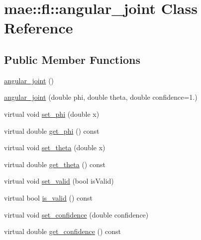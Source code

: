 \hypertarget{classmae_1_1fl_1_1angular__joint}{\section{mae\-:\-:fl\-:\-:angular\-\_\-joint Class Reference}
\label{classmae_1_1fl_1_1angular__joint}
}
\subsection*{Public Member Functions}
\begin{DoxyCompactItemize}
\item 
\hyperlink{classmae_1_1fl_1_1angular__joint_a22ba6c973e1e3c0c91b8d48948529182}{angular\-\_\-joint} ()
\item 
\hyperlink{classmae_1_1fl_1_1angular__joint_a100bba0dfbbe4a0d9bff62a3d3831934}{angular\-\_\-joint} (double phi, double theta, double confidence=1.)
\item 
virtual void \hyperlink{classmae_1_1fl_1_1angular__joint_ad0df6abcd02ebd7f536fcb0936a359d0}{set\-\_\-phi} (double x)
\item 
virtual double \hyperlink{classmae_1_1fl_1_1angular__joint_a780ff68cff4e673b31c0ccdcead81440}{get\-\_\-phi} () const 
\item 
virtual void \hyperlink{classmae_1_1fl_1_1angular__joint_abf699155f7efa2c2b0052f064e8efacc}{set\-\_\-theta} (double x)
\item 
virtual double \hyperlink{classmae_1_1fl_1_1angular__joint_a5452def9f039c981b553ae7783dbf4c7}{get\-\_\-theta} () const 
\item 
virtual void \hyperlink{classmae_1_1fl_1_1angular__joint_ae4a858f782f3af9ba88a4f3b9fb29317}{set\-\_\-valid} (bool is\-Valid)
\item 
virtual bool \hyperlink{classmae_1_1fl_1_1angular__joint_a5235990dd2181368ad716172c348a663}{is\-\_\-valid} () const 
\item 
virtual void \hyperlink{classmae_1_1fl_1_1angular__joint_a4ae61fdcaa4746d56a32f14a51ebfa37}{set\-\_\-confidence} (double confidence)
\item 
virtual double \hyperlink{classmae_1_1fl_1_1angular__joint_a2b9aea9baff5d9dcb56aa8b0be1a7d59}{get\-\_\-confidence} () const 
\end{DoxyCompactItemize}
